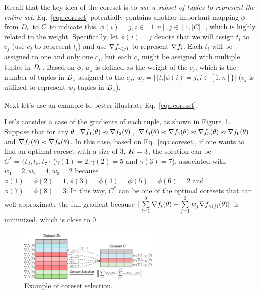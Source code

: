 Recall that the key idea of the coreset is to \textit{use a subset of tuples to represent the entire set}.  Eq.~\ref{eqa:coreset} potentially contains another important mapping $\phi$ from $D_c$ to $C$ to indicate this, \ie $\phi(i) = j, i\in[1,n],  j\in[1,|C|]$, which is highly related to the weight. Specifically, let $\phi(i) = j$ denote that we will assign  $t_i$ to $c_j$ (use $c_j$ to represent $t_i$) and use $\nabla f_{\gamma(j)}$  to represent $\nabla f_i$. Each $t_i$ will be assigned to one and only one $c_j$, but each  $c_j$ might be assigned with multiple tuples in $D_c$. Based on $\phi$,
$w_j$ is defined as the weight of  the $c_j$, which is the number of tuples in $D_c$ assigned to the $c_j$, \ie $w_j = |\{t_i|\phi(i) = j, i\in[1,n]\}|$ ($c_j$ is utilized to represent $w_j$ tuples in $D_c$). 

Next let's use an example to better illustrate Eq.~\ref{eqa:coreset}.



\begin{example}\label{example:singletable}
	Let's consider a  case of the gradients of each tuple, as shown in Figure~\ref{fig:overviewSingle}. Suppose that for any $\theta$, $\nabla f_1(\theta)\approx\nabla f_2(\theta)$, $\nabla f_3(\theta)\approx\nabla f_4(\theta)\approx\nabla f_5(\theta)\approx\nabla f_6(\theta)$ and $\nabla f_7(\theta)\approx\nabla f_8(\theta)$. In this case, based on Eq.~\ref{eqa:coreset}, if one wants to find an optimal coreset with a size of  3, \ie $K=3$, the solution can be $C^* = \{t_2, t_5, t_7\}$ ($\gamma(1)=2, \gamma(2)=5$ and $\gamma(3)=7$), associated with $w_1=2, w_2=4, w_3=2$ because $\phi(1) = \phi(2) = 1, \phi(3) = \phi(4) = \phi(5) = \phi(6) = 2 $ and $\phi(7) = \phi(8) = 3$. In this way, $C^*$ can be one of the optimal coresets that can well approximate the full gradient because  $\lVert \sum\limits_{i=1}^8\nabla f_i(\theta) - \sum\limits_{j=1}^{3}w_j\nabla f_{\gamma(j)}(\theta) \rVert  $ is minimized, which is close to 0.
\end{example}


\begin{figure}[t]
	\centering
	\includegraphics[width=0.6\textwidth]{figs/coresetExample}
	\caption{Example of coreset selection.}
	\label{fig:overviewSingle}
\end{figure}

